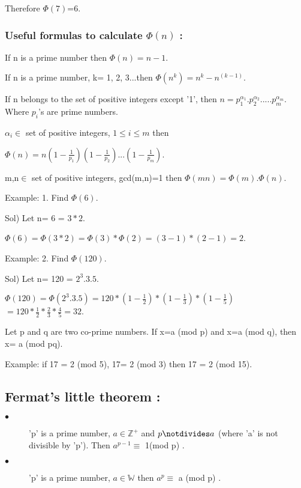 \documentclass{article}
\begin{document}
    Therefore $\Phi(7)$=6.
    \subsubsection{Useful formulas to calculate $\Phi(n)$ :}
    \begin{description}
    	\item[$\bullet$] If n is a prime number then $\Phi(n)=n-1$.
    	\item[$\bullet$] If n is a prime number, k= 1, 2, 3...then $\Phi(n^{k})=n^{k}-n^{(k-1)}$.
    	
       	\item[$\bullet$] If n belongs to the set of positive integers except '1',
       	then $n=p^{\alpha_{1}}_{1}. p^{\alpha_{2}}_{2}.....p^{\alpha_{m}}_{m}$.
       	Where $p_{i}$'s are prime numbers.
       	
       $\alpha_{i}\in$ set of positive integers,  $ 1\leq i \leq m$ then
       
       $\Phi(n)= n(1-\frac{1}{p_{1}})(1-\frac{1}{p_{2}})...(1-\frac{1}{p_{m}}).$
       \item[$\bullet$]  m,n$\in$ set of positive integers, gcd(m,n)=1 then
       $\Phi(mn)=\Phi(m).\Phi(n)$.
       
      \item  Example: 1. Find $ \Phi(6)$.
       
       Sol) Let n= 6 = $3*2$.
       
      $ \Phi(6)=\Phi(3*2)=\Phi(3)*\Phi(2)=(3-1)*(2-1)=2$.
      
      \item Example: 2. Find $ \Phi(120)$.
      
      Sol) Let n= 120 = $2^{3}.3.5$.
      
      $ \Phi(120)=\Phi(2^{3}.3.5)=120*(1-\frac{1}{2})*(1-\frac{1}{3})*(1-\frac{1}{5})$
                       $=120*\frac{1}{2}*\frac{2}{3}*\frac{4}{5}=32$.   
      \item[$\bullet$] Let p and q are two co-prime numbers. If x=a (mod p)   and x=a (mod q), 
      then x= a (mod pq).
      
      Example: if 17 = 2 (mod 5), 17= 2 (mod 3) then 17 = 2 (mod 15).    	
    	
    \end{description}
\subsection{Fermat's little theorem :}
\begin{description}
	\item[$\bullet$] 'p' is a prime number, $a\in \mathbb{Z^{+}}$ and  $p \notdivides a$ (where 'a' is not divisible by 'p').
	 Then $a^{p-1} \equiv$ 1(mod p) .
	 \item[$\bullet$] 'p' is a prime number, $a\in \mathbb{W}$ then  $a^{p} \equiv$ a (mod p) .
\end{description}
\end{document}
